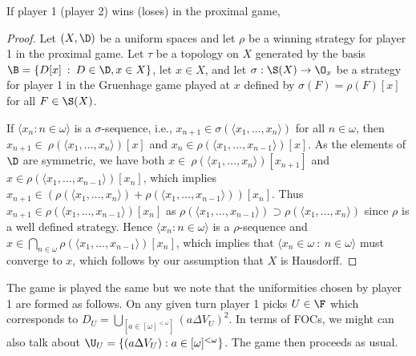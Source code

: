 \documentclass{article}
\begin{document}
\begin{prop}
    If player 1 (player 2) wins (loses) in the proximal game, %
\end{prop}
\begin{proof}
    Let \((X, \D)\) be a uniform spaces and let \(\rho\) be a winning strategy for player 1 in the proximal game. Let \(\tau\) be a topology on \(X\) generated by the basis \(\B = \{D[x] \: : \: D \in \D, x \in X\}\), let \(x \in X\), and let \(\sigma: \S(X) \to \O_x\) be a strategy for player 1 in the Gruenhage game played at \(x\) defined by \(\sigma(F) = \rho(F)[x]\) for all \(F \in \S(X)\). 
    
    If \(\langle x_n : n \in \omega \rangle\) is a \(\sigma\)-sequence, i.e., \(x_{n +1} \in \sigma\left(\langle x_1, \dots, x_n\rangle\right)\) for all \(n \in \omega\), then \(x_{n +1} \in \ \rho\left(\langle x_1, \dots, x_n\rangle\right)[x]\) and \(x_n \in \rho\left(\langle x_1, \dots, x_{n - 1}\rangle\right)[x]\).
    As the elements of \(\D\) are symmetric, we have both \(x \in \ \rho\left(\langle x_1, \dots, x_n\rangle\right)[x_{n + 1}]\) and \(x \in \rho\left(\langle x_1, \dots, x_{n - 1}\rangle\right)[x_n]\), which implies \(x_{n + 1} \in \left(\rho\left(\langle x_1, \dots, x_n\rangle\right) +  \rho\left(\langle x_1, \dots, x_{n - 1}\rangle\right)\right)[x_n]\). Thus \(x_{n + 1} \in \rho\left(\langle x_1, \dots, x_{n - 1}\rangle\right)[x_n]\) as \(\rho\left(\langle x_1, \dots, x_{n - 1}\rangle\right) \supset \rho\left(\langle x_1, \dots, x_n\rangle\right)\) since \(\rho\) is a well defined strategy. Hence \(\langle x_n : n \in \omega \rangle\) is a \(\rho\)-sequence and \(x \in \bigcap_{n \in \omega}\rho\left(\langle x_1, \dots, x_{n - 1}\rangle\right)[x_n]\), which implies that \(\langle x_n \in \omega \: : \: n \in \omega\rangle\) must converge to \(x\), which follows by our assumption that \(X\) is Hausdorff.
\end{proof}

\begin{rem}
    The game is played the same but we note that the uniformities chosen by player 1 are formed as follows. On any given turn player 1 picks \(U \in \F\) which corresponds to \(D_U = \bigcup_[a \in [\omega]^{<\omega}]\left(a\Delta V_U\right)^2\). In terms of FOCs, we might can also talk about \(\U_U = \{(a\Delta V_U):a \in [\omega]^{<\omega}\}\). The game then proceeds as usual.
\end{rem}









%
\end{document}
